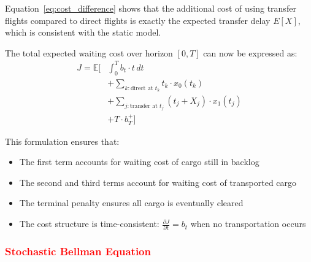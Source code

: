 \documentclass[opre,sglanonrev]{informs4}
\begin{document}
{Equation~\eqref{eq:cost_difference} shows that the additional cost of using transfer flights compared to direct flights is exactly the expected transfer delay \( E[X] \), which is consistent with the static model.

The total expected waiting cost over horizon \( [0, T] \) can now be expressed as:
\begin{align}
J = \mathbb{E}\bigg[ & \int_0^T b_t \cdot t \, dt \nonumber \\
& + \sum_{k: \text{direct at } t_k} t_k \cdot x_0(t_k) \nonumber \\
& + \sum_{j: \text{transfer at } t_j} (t_j + X_j) \cdot x_1(t_j) \nonumber \\
& + T \cdot b_T^+ \bigg] \label{eq:total_cost}
\end{align}

This formulation ensures that:
\begin{itemize}
    \item The first term accounts for waiting cost of cargo still in backlog
    \item The second and third terms account for waiting cost of transported cargo
    \item The terminal penalty ensures all cargo is eventually cleared
    \item The cost structure is time-consistent: \( \frac{\partial J}{\partial t} = b_t \) when no transportation occurs
\end{itemize}
}

\subsubsection{\textcolor{red}{Stochastic Bellman Equation}}
\end{document}

